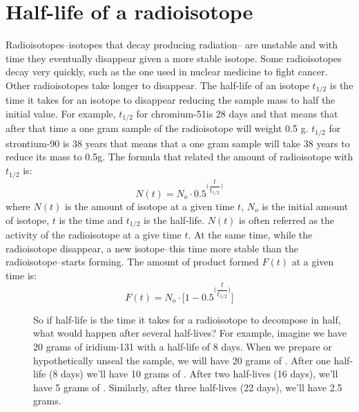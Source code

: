 \documentclass[main.tex]{subfiles}
\begin{document}
\section{Half-life of a radioisotope}
Radioisotopes--isotopes that decay producing radiation-- are unstable and with time they eventually disappear given a more stable isotope. Some radioisotopes decay very quickly, such as the one used in nuclear medicine to fight cancer. Other radioisotopes take longer to disappear. The half-life of an isotope $t_{1/2}$ is the time it takes for an isotope to disappear reducing the sample mass to half the initial value. For example, $t_{1/2}$ for chromium-51is 28 days and that means that after that time a one gram sample of the radioisotope will weight 0.5 g. $t_{1/2}$ for strontium-90 is 38 years that means that a one gram sample will take 38 years to reduce its mass to 0.5g. The formula that related the amount of radioisotope with $t_{1/2}$ is:
\begin{equation} \boxed{    N(t)=N_o\cdot 0.5^{\big(\dfrac{t}{t_{1/2}}\big)}  } \label{formula4:1}\end{equation}
where $N(t)$ is the amount of isotope at a given time $t$, $N_o$ is the initial amount of isotope, $t$ is the time and $t_{1/2}$  is the half-life. $N(t)$ is often referred as the activity of the radioisotope at a give time $t$. At the same time, while the radioisotope disappear, a new isotope--this time more stable than the radioisotope--starts forming. The amount of product formed $F(t)$ at a given time is:
\begin{equation} \boxed{    F(t)=N_o\cdot \Big[1-0.5 ^{\big(\dfrac{t}{t_{1/2}}\big)} \Big] } \label{formula4:2}\end{equation}
\begin{description}
\item[] So if half-life is the time it takes for a radioisotope to decompose in half, what would happen after several half-lives? For example, imagine we have 20 grams of iridium-131 with a half-life of 8 days. When we prepare or hypothetically unseal the sample, we will have 20 grams of . After one half-life (8 days) we'll have 10 grams of . After two half-lives (16 days), we'll have 5 grams of . Similarly, after three half-lives (22 days), we'll have 2.5 grams.
\end{description}
\end{document}
